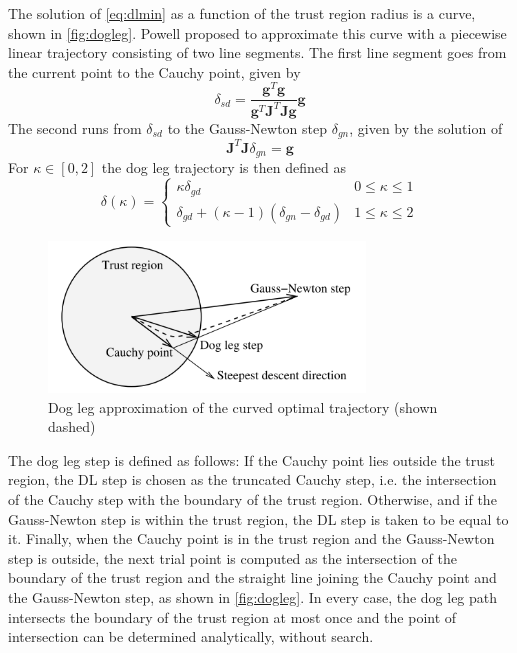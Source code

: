 The solution of \autoref{eq:dlmin} as a function of the trust region radius is a curve, shown in \autoref{fig:dogleg}. Powell \cite{powell1970hybrid} proposed to approximate this curve with a piecewise linear trajectory consisting of two line segments. The first line segment goes from the current point to the Cauchy point, given by
\begin{equation}
  \delta_{sd} = \frac{\mathbf{g}^T\mathbf{g}}{\mathbf{g}^T\mathbf{J}^T\mathbf{J}\mathbf{g}} \mathbf{g}
\end{equation}
The second runs from $\delta_{sd}$ to the Gauss-Newton step $\delta_{gn}$, given by the solution of
\begin{equation}
  \mathbf{J}^T\mathbf{J} \delta_{gn} = \mathbf{g}
  \label{eq:dlgn}
\end{equation}
For $\kappa \in [0, 2]$ the dog leg trajectory is then defined as
\begin{equation}
  \delta(\kappa) = 
    \begin{cases}
      \kappa \delta_{gd} & 0 \le \kappa \le 1 \\
      \delta_{gd} + (\kappa -1)(\delta_{gn} - \delta_{gd}) & 1 \le \kappa \le 2
    \end{cases}
\end{equation}

\begin{figure}[H]
  \centering
  \includegraphics[width=0.75\textwidth]{images/dogleg}
  \caption{Dog leg approximation of the curved optimal trajectory (shown dashed)}
  \label{fig:dogleg}
\end{figure}

The dog leg step is defined as follows: If the Cauchy point lies outside the trust region, the \ac{DL} step is chosen as the truncated Cauchy step, i.e. the intersection of the Cauchy step with the boundary of the trust region. Otherwise, and if the Gauss-Newton step is within the trust region, the \ac{DL} step is taken to be equal to it. Finally, when the Cauchy point is in the trust region and the Gauss-Newton step is outside, the next trial point is computed as the intersection of the boundary of the trust region and the straight line joining the Cauchy point and the Gauss-Newton step, as shown in \autoref{fig:dogleg}. In every case, the dog leg path intersects the boundary of the trust region at most once and the point of intersection can be determined analytically, without search.\\

